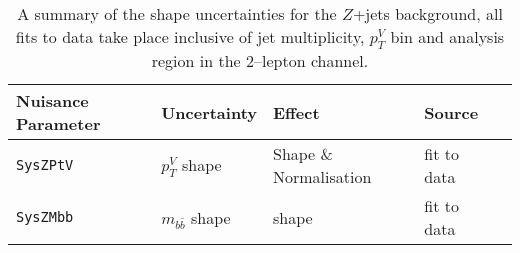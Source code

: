 \begin{table}[!htb]
  \begin{tabular}{lllll}
    \toprule
    {\bfseries Nuisance Parameter} & {\bfseries Uncertainty} & {\bfseries Effect} & {\bfseries Source} \\
    \midrule
    \texttt{SysZPtV} & $p_T^V$ shape & Shape \& Normalisation &  fit to data \\
    \texttt{SysZMbb} & $m_{b\bar{b}}$ shape & shape 	& fit to data \\
    \bottomrule
  \end{tabular}
  \caption{A summary of the shape uncertainties for the $Z$+jets background, all
    fits to data take place inclusive of jet multiplicity, $p_T^V$ bin and
    analysis region in the 2--lepton channel.}
  \label{tab:zjets-shapes}
\end{table}